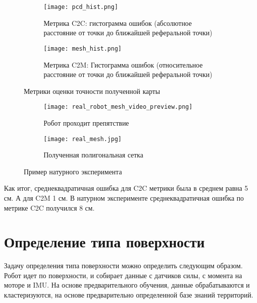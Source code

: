 \begin{figure}[h]
    \begin{subfigure}[t]{0.49\textwidth}
        \centering\texttt{[image: pcd\_hist.png]}
        \caption{Метрика C2C: гистограмма ошибок (абсолютное расстояние от точки до ближайшей реферальной точки)}
        \label{fig:metric_c2c}
    \end{subfigure}
    \begin{subfigure}[t]{0.49\textwidth}
        \centering\texttt{[image: mesh\_hist.png]}
        \caption{Метрика C2M: Гистограмма ошибок (относительное расстояние от точки до ближайшей реферальной точки)}
        \label{fig:metric_c2m}
    \end{subfigure}
    \caption{Метрики оценки точности полученной карты}
    \label{fig:metrics}
\end{figure}


\begin{figure}[h]
    \begin{subfigure}[t]{0.49\textwidth}
            \centering\texttt{[image: real\_robot\_mesh\_video\_preview.png]}
        \caption{Робот проходит препятствие}
        \label{fig:real_robot_mesh_video_preview.png}
    \end{subfigure}
    \begin{subfigure}[t]{0.49\textwidth}
        \centering\texttt{[image: real\_mesh.jpg]}
        \caption{Полученная полигональная сетка}
        \label{fig:real_mesh.jpg}
    \end{subfigure}
    \caption{Пример натурного эксперимента}
    \label{fig:real_exp_map_creation}
\end{figure}

Как итог, среднеквадратичная ошибка для C2C метрики была в среднем равна 5 см. А для C2M 1 см. В натурном эксперименте среднеквадратичная ошибка по метрике C2C получился 8 см.

\section{Определение типа поверхности}

Задачу определения типа поверхности можно определить следующим образом. Робот идет по поверхности, и собирает данные с датчиков силы, с момента на моторе и IMU. На основе предварительного обучения, данные обрабатываются и кластеризуются, на основе предварительно определенной базе знаний территорий.

